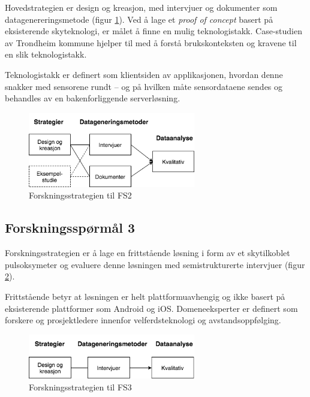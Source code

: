 Hovedstrategien er design og kreasjon, med intervjuer og dokumenter som datagenereringsmetode (figur \ref{fig:oates_fs2}). Ved å lage
et \textit{proof of concept} basert på eksisterende skyteknologi, er målet å finne en mulig teknologistakk. Case-studien av Trondheim
kommune hjelper til med å forstå brukskonteksten og kravene til en slik teknologistakk.

Teknologistakk er definert
som klientsiden av applikasjonen, hvordan denne snakker med sensorene rundt -- og på hvilken måte sensordataene sendes og behandles av
en bakenforliggende serverløsning.

\begin{figure}
\centering
\includegraphics[width=0.65\textwidth]{fig/oates/fs2}
\caption{Forskningsstrategien til FS2}
\label{fig:oates_fs2}
\end{figure}
    
\subsection{Forskningsspørmål 3}
\textbf{}

Forskningsstrategien er å lage en frittstående løsning i form av et skytilkoblet pulsoksymeter og evaluere
denne løsningen med semistrukturerte intervjuer (figur \ref{fig:oates_fs3}).
 
Frittstående betyr at løsningen er helt plattformuavhengig og ikke basert på eksisterende plattformer som Android og iOS.
Domeneeksperter er definert som forskere og prosjektledere innenfor velferdsteknologi og avstandsoppfølging.

\begin{figure}
\centering
\includegraphics[width=0.65\textwidth]{fig/oates/fs3}
\caption{Forskningsstrategien til FS3}
\label{fig:oates_fs3}
\end{figure}

